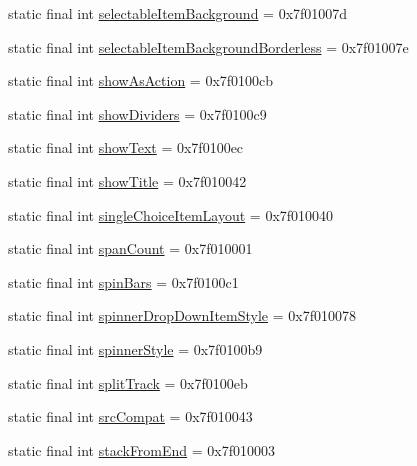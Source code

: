 \begin{CompactItemize}
\item 
static final int \hyperlink{classandroid_1_1support_1_1mediacompat_1_1_r_1_1attr_7cb8a3f2a6679454d0a5c8448a560836}{selectableItemBackground} = 0x7f01007d
\item 
static final int \hyperlink{classandroid_1_1support_1_1mediacompat_1_1_r_1_1attr_b8ed5c6555b45508ed1ae2cb2e7b26d6}{selectableItemBackgroundBorderless} = 0x7f01007e
\item 
static final int \hyperlink{classandroid_1_1support_1_1mediacompat_1_1_r_1_1attr_eae34d80038ee0f0e9010ef4b4b40928}{showAsAction} = 0x7f0100cb
\item 
static final int \hyperlink{classandroid_1_1support_1_1mediacompat_1_1_r_1_1attr_94869b086aa75660a61533fc0fa84c8f}{showDividers} = 0x7f0100c9
\item 
static final int \hyperlink{classandroid_1_1support_1_1mediacompat_1_1_r_1_1attr_a248361c65aaf4539a0f201645683ec2}{showText} = 0x7f0100ec
\item 
static final int \hyperlink{classandroid_1_1support_1_1mediacompat_1_1_r_1_1attr_1d4933a059c972c8deee2bc3c1ad60c1}{showTitle} = 0x7f010042
\item 
static final int \hyperlink{classandroid_1_1support_1_1mediacompat_1_1_r_1_1attr_484058fe92f20c0c8950560cd0c1bd97}{singleChoiceItemLayout} = 0x7f010040
\item 
static final int \hyperlink{classandroid_1_1support_1_1mediacompat_1_1_r_1_1attr_3910ebcddd591824dd25c1de1619a613}{spanCount} = 0x7f010001
\item 
static final int \hyperlink{classandroid_1_1support_1_1mediacompat_1_1_r_1_1attr_d6813905142295ef6df1cce6128cb84c}{spinBars} = 0x7f0100c1
\item 
static final int \hyperlink{classandroid_1_1support_1_1mediacompat_1_1_r_1_1attr_ca22fc4ae145cd88f06237a75d311011}{spinnerDropDownItemStyle} = 0x7f010078
\item 
static final int \hyperlink{classandroid_1_1support_1_1mediacompat_1_1_r_1_1attr_683415e92ef6cf5c3fbdb617e0f8399d}{spinnerStyle} = 0x7f0100b9
\item 
static final int \hyperlink{classandroid_1_1support_1_1mediacompat_1_1_r_1_1attr_8ad77ded7085aa19f52b1e580daa3f9f}{splitTrack} = 0x7f0100eb
\item 
static final int \hyperlink{classandroid_1_1support_1_1mediacompat_1_1_r_1_1attr_9f91abfbfc94146019ccf5319d05ddde}{srcCompat} = 0x7f010043
\item 
static final int \hyperlink{classandroid_1_1support_1_1mediacompat_1_1_r_1_1attr_8412aa91d8c236d7be7a0af2406d0344}{stackFromEnd} = 0x7f010003

\end{CompactItemize}
